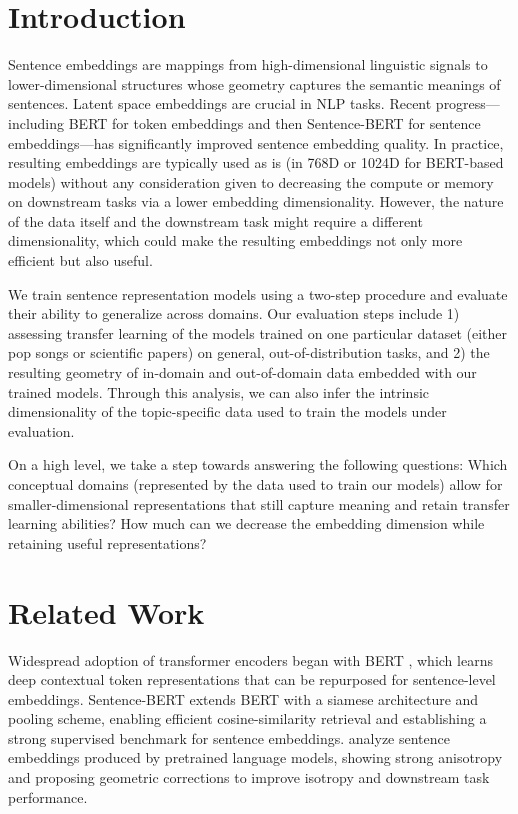 \documentclass{article}
\begin{document}
\section{Introduction}
Sentence embeddings are mappings from high-dimensional linguistic signals to lower-dimensional structures
whose geometry captures the semantic meanings of sentences. Latent space embeddings are crucial in NLP tasks.
Recent progress—including BERT \cite{devlin2019bert} for token embeddings and then Sentence-BERT
\cite{reimers2019sentencebert} for sentence embeddings—has significantly improved sentence embedding quality.
In practice, resulting embeddings are typically used as is (in 768D or 1024D for BERT-based models) without
any consideration given to decreasing the compute or memory on downstream tasks via a lower embedding
dimensionality. However, the nature of the data itself and the downstream task might require a different
dimensionality, which could make the resulting embeddings not only more efficient but also useful.

We train sentence representation models using a two-step procedure and evaluate their ability to generalize
across domains. Our evaluation steps include 1) assessing transfer learning of the models trained on one
particular dataset (either pop songs or scientific papers) on general, out-of-distribution tasks, and 2) the
resulting geometry of in-domain and out-of-domain data embedded with our trained models. Through this
analysis, we can also infer the intrinsic dimensionality of the topic-specific data used to train the models
under evaluation.

On a high level, we take a step towards answering the following questions: Which conceptual domains
(represented by the data used to train our models) allow for smaller-dimensional representations that still
capture meaning and retain transfer learning abilities? How much can we decrease the embedding dimension
while retaining useful representations?

\section{Related Work}
Widespread adoption of transformer encoders began with BERT \cite{devlin2019bert}, which learns deep
contextual token representations that can be repurposed for sentence-level embeddings. Sentence-BERT
\cite{reimers2019sentencebert} extends BERT with a siamese architecture and pooling scheme, enabling
efficient cosine-similarity retrieval and establishing a strong supervised benchmark for sentence embeddings.
\cite{li2020sentenceembeddingdim} analyze sentence embeddings produced by pretrained language
models, showing strong anisotropy and proposing geometric corrections to improve isotropy and downstream task
performance.
\end{document}
